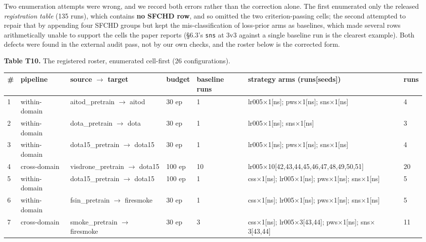 \documentclass[pdflatex,sn-mathphys-ay]{sn-jnl}
\begin{document}
Two enumeration attempts were wrong, and we record both errors rather than the correction alone. The first enumerated only the released \emph{registration table} (135 runs), which contains \textbf{no SFCHD row}, and so omitted the two criterion-passing cells; the second attempted to repair that by appending four SFCHD groups but kept the mis-classification of loss-prior arms as baselines, which made several rows arithmetically unable to support the cells the paper reports (\S{}6.3's \texttt{sns} at 3v3 against a single baseline run is the clearest example). Both defects were found in the external audit pass, not by our own checks, and the roster below is the corrected form.

\textbf{Table T10.} The registered roster, enumerated cell-first (26 configurations).

{\footnotesize
\setlength{\tabcolsep}{4pt}
\begin{longtable}{p{}p{}p{}p{}p{}p{}p{}}
\toprule
\# & pipeline & source \ensuremath{\rightarrow} target & budget & baseline runs & strategy arms (runs[seeds]) & runs \\
\midrule
\endhead
1 & within-domain & aitod\_pretrain \ensuremath{\rightarrow} aitod & 30 ep & 1 & lr005\ensuremath{\times}1[ns]; pws\ensuremath{\times}1[ns]; sns\ensuremath{\times}1[ns] & 4 \\
2 & within-domain & dota\_pretrain \ensuremath{\rightarrow} dota & 30 ep & 1 & lr005\ensuremath{\times}1[ns]; sns\ensuremath{\times}1[ns] & 3 \\
3 & within-domain & dota15\_pretrain \ensuremath{\rightarrow} dota15 & 30 ep & 1 & lr005\ensuremath{\times}1[ns]; pws\ensuremath{\times}1[ns]; sns\ensuremath{\times}1[ns] & 4 \\
4 & cross-domain & visdrone\_pretrain \ensuremath{\rightarrow} dota15 & 100 ep & 10 & lr005\ensuremath{\times}10[42,43,44,45,46,47,48,49,50,51] & 20 \\
5 & within-domain & dota15\_pretrain \ensuremath{\rightarrow} dota15 & 100 ep & 1 & css\ensuremath{\times}1[ns]; lr005\ensuremath{\times}1[ns]; pws\ensuremath{\times}1[ns]; sns\ensuremath{\times}1[ns] & 5 \\
6 & within-domain & fsin\_pretrain \ensuremath{\rightarrow} firesmoke & 30 ep & 1 & css\ensuremath{\times}1[ns]; lr005\ensuremath{\times}1[ns]; pws\ensuremath{\times}1[ns]; sns\ensuremath{\times}1[ns] & 5 \\
7 & cross-domain & smoke\_pretrain \ensuremath{\rightarrow} firesmoke & 30 ep & 3 & css\ensuremath{\times}1[ns]; lr005\ensuremath{\times}3[43,44]; pws\ensuremath{\times}1[ns]; sns\ensuremath{\times}3[43,44] & 11 \\

\end{longtable}}
\end{document}
